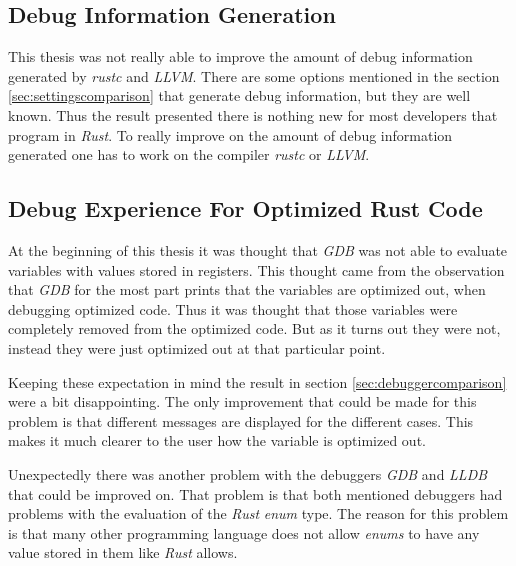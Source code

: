 



\subsection{Debug Information Generation}
This thesis was not really able to improve the amount of debug information generated by \emph{rustc} and \emph{LLVM}.
There are some options mentioned in the section \ref{sec:settingscomparison} that generate debug information, but they are well known.
Thus the result presented there is nothing new for most developers that program in \emph{Rust}.
To really improve on the amount of debug information generated one has to work on the compiler \emph{rustc} or \emph{LLVM}.


\subsection{Debug Experience For Optimized Rust Code}
At the beginning of this thesis it was thought that \emph{GDB} was not able to evaluate variables with values stored in registers.
This thought came from the observation that \emph{GDB} for the most part prints that the variables are optimized out, when debugging optimized code.
Thus it was thought that those variables were completely removed from the optimized code.
But as it turns out they were not, instead they were just optimized out at that particular point.


Keeping these expectation in mind the result in section \ref{sec:debuggercomparison} were a bit disappointing.
The only improvement that could be made for this problem is that different messages are displayed for the different cases.
This makes it much clearer to the user how the variable is optimized out.


Unexpectedly there was another problem with the debuggers \emph{GDB} and \emph{LLDB} that could be improved on.
That problem is that both mentioned debuggers had problems with the evaluation of the \emph{Rust} \emph{enum} type.
The reason for this problem is that many other programming language does not allow \emph{enums} to have any value stored in them like \emph{Rust} allows.


